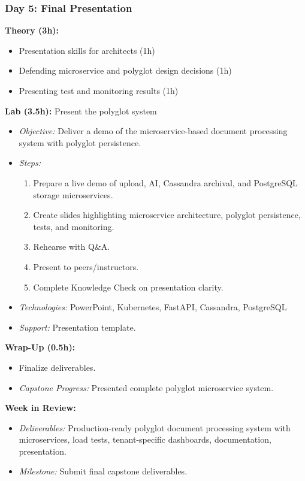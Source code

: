 \documentclass[11pt]{article}
\begin{document}
\subsubsection{Day 5: Final Presentation}
\textbf{Theory (3h):}
\begin{itemize}
    \item Presentation skills for architects (1h)
    \item Defending microservice and polyglot design decisions (1h)
    \item Presenting test and monitoring results (1h)
\end{itemize}
\textbf{Lab (3.5h):} Present the polyglot system
\begin{itemize}
    \item \textit{Objective:} Deliver a demo of the microservice-based document processing system with polyglot persistence.
    \item \textit{Steps:}
        \begin{enumerate}
            \item Prepare a live demo of upload, AI, Cassandra archival, and PostgreSQL storage microservices.
            \item Create slides highlighting microservice architecture, polyglot persistence, tests, and monitoring.
            \item Rehearse with Q\&A.
            \item Present to peers/instructors.
            \item Complete Knowledge Check on presentation clarity.
        \end{enumerate}
    \item \textit{Technologies:} PowerPoint, Kubernetes, FastAPI, Cassandra, PostgreSQL
    \item \textit{Support:} Presentation template.
\end{itemize}
\textbf{Wrap-Up (0.5h):}
\begin{itemize}
    \item Finalize deliverables.
    \item \textit{Capstone Progress:} Presented complete polyglot microservice system.
\end{itemize}

\textbf{Week in Review:}
\begin{itemize}
    \item \textit{Deliverables:} Production-ready polyglot document processing system with microservices, load tests, tenant-specific dashboards, documentation, presentation.
    \item \textit{Milestone:} Submit final capstone deliverables.
\end{itemize}
\end{document}

